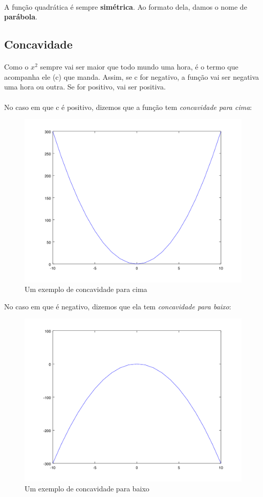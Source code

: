 \documentclass[11pt]{article}
\begin{document}
\paragraph{}
A função quadrática é sempre \textbf{simétrica}. Ao formato dela, damos
o nome de \textbf{parábola}.

\subsection{Concavidade}
\paragraph{}
Como o $x^2$ sempre vai ser maior que todo mundo uma hora, é o termo que 
acompanha ele (c) que manda. Assim, se c for negativo, a função vai ser
negativa uma hora ou outra. Se for positivo, vai ser positiva.
\paragraph{}
No caso em que c é positivo, dizemos que a função tem 
\textit{concavidade para cima}:
\begin{figure}[H]
	\centering
	\includegraphics[width=0.8\linewidth]{imgs2/chart3.png}
	\caption{Um exemplo de concavidade para cima}
\end{figure}
No caso em que é negativo, dizemos que ela tem \textit{concavidade para 
baixo}:
\begin{figure}[H]
	\centering
	\includegraphics[width=0.8\linewidth]{imgs2/chart4.png}
	\caption{Um exemplo de concavidade para baixo}
\end{figure}
\end{document}
